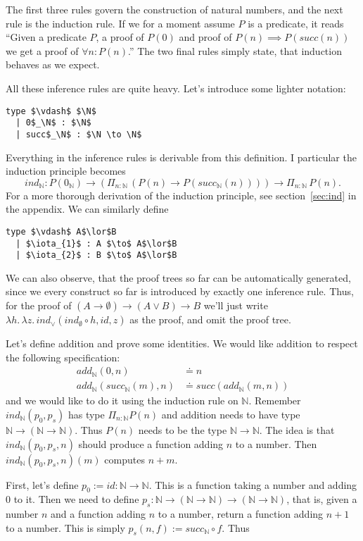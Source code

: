 \documentclass[a4paper, 12pt]{article}
\newcommand{\N}{\mathbb{N}}
\newcommand{\la}[1]{\lambda{#1}.\,}
\theoremstyle{changedot}
\theoremstyle{changedotbreak}
\theoremstyle{nonumberplain}
\begin{document}
The first three rules govern the construction of natural numbers, and the next rule is the induction rule. If we for a moment assume $P$ is a predicate, it reads ``Given a predicate $P$, a proof of $P(0)$ and proof of $P(n) \implies P(succ(n))$ we get a proof of $\forall n: P(n)$.'' The two final rules simply state, that induction behaves as we expect.

All these inference rules are quite heavy. Let's introduce some lighter notation:

\begin{lstlisting}[mathescape=true]
  type $\vdash$ $\N$
  | 0$_\N$ : $\N$
  | succ$_\N$ : $\N \to \N$
\end{lstlisting}

Everything in the inference rules is derivable from this definition. I particular the induction principle becomes \[ind_{\N} : P(0_{\N}) \to (\Pi_{n:\N}\, (P(n) \to P(succ_{\N}(n)))) \to \Pi_{n:\N}\, P(n).\] For a more thorough derivation of the induction principle, see section~\ref{sec:ind} in the appendix. We can similarly define

\begin{lstlisting}[mathescape=true]
  type $\vdash$ A$\lor$B
  | $\iota_{1}$ : A $\to$ A$\lor$B
  | $\iota_{2}$ : B $\to$ A$\lor$B
\end{lstlisting}

We can also observe, that the proof trees so far can be automatically generated, since we every construct so far is introduced by exactly one inference rule. Thus, for the proof of $(A \to \emptyset) \to (A \lor B) \to B$ we'll just write $\la h \la z ind_{\lor}(ind_{\emptyset} \circ h, id, z)$ as the proof, and omit the proof tree.

Let's define addition and prove some identities. We would like addition to respect the following specification:
\begin{align*}
  \mathit{add}_{\N} (0, n) &\doteq n \\
  \mathit{add}_{\N} (succ_{\N}(m), n) &\doteq succ(\mathit{add}_{\N}(m, n))
\end{align*}
and we would like to do it using the induction rule on $\N$. Remember $ind_{\N}(p_{0}, p_{s})$ has type $\Pi_{n:\N} P(n)$ and addition needs to have type $\N \to (\N \to \N)$. Thus $P(n)$ needs to be the type $\N \to \N$. The idea is that $ind_{\N}(p_{0}, p_{s}, n)$ should produce a function adding $n$ to a number. Then $ind_{\N}(p_{0}, p_{s}, n)(m)$ computes $n+m$.

First, let's define $p_{0} := id : \N \to \N$. This is a function taking a number and adding 0 to it. Then we need to define $p_{s} : \N \to (\N \to \N) \to (\N \to \N)$, that is, given a number $n$ and a function adding $n$ to a number, return a function adding $n+1$ to a number. This is simply $p_{s}(n, f) := succ_{\N} \circ f$. Thus
\end{document}
